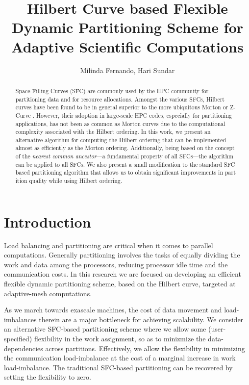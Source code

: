 \documentclass{sig-alternate}
\title{Hilbert Curve based Flexible Dynamic Partitioning Scheme for Adaptive Scientific Computations}
\author{Milinda Fernando, Hari Sundar}
\affil{School of Computing, University of Utah}
\date{}
\begin{document}
\maketitle

\begin{abstract}

  Space Filling Curves (SFC) are commonly used by the HPC community for partitioning data\cite{campbell2003,devine2005,sundar2007} and for resource allocations\cite{bender51,slurm}. Amongst the various SFCs, Hilbert curves have been found to be in general superior to the more ubiquitous Morton or Z-Curve \cite{campbell2003}. However, their adoption in large-scale HPC codes, especially for partitioning applications, has not been as common as Morton curves due to the computational complexity associated with the Hilbert ordering. In this work, we present an alternative algorithm for computing the Hilbert ordering that can be implemented almost as efficiently as the Morton ordering. Additionally, being based on the concept of the {\em nearest common ancestor}---a fundamental property of all SFCs---the algorithm can be applied to all SFCs. We also present a small modification to the standard SFC based partitioning algorithm that allows us to obtain significant improvements in part
 ition quality while using Hilbert ordering.
\end{abstract}

\section{Introduction}

Load balancing and partitioning are critical when it comes to parallel computations. Generally partitioning involves the tasks of equally dividing the work and data among the processors,
reducing processor idle time and the communication costs. 
In this research we are focused on developing an efficient flexible dynamic
partitioning scheme, based on the Hilbert curve, targeted at adaptive-mesh computations. 

As we march towards exascale machines, the cost of data movement and load-imbalances therein are a major bottleneck for achieving scalability. We consider an alternative SFC-based partitioning scheme where we allow some (user-specified) flexibility in the work assignment, so as to minizmize the data-dependencies across partitions. Effectively, we allow the flexibility in minimizing the communication load-imbalance at the cost of a marginal increase in work load-imbalance. The traditional SFC-based partitioning can be recovered by setting the flexibility to zero.  
\end{document}
